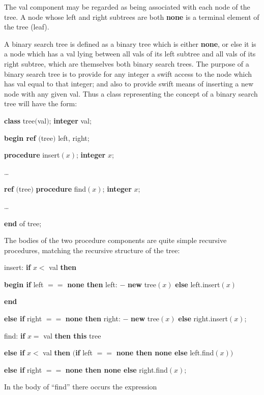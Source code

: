 \documentclass[twoside,11pt]{book}
\begin{document}
\noindent
The val component may be regarded as being associated with each node of the tree. A node whose left and right subtrees are both \textbf{none} is a terminal element of the tree (leaf).

A binary search tree is defined as a binary tree which is either \textbf{none}, or else it is a node which has a val lying between all vals of its left subtree and all vals of its right subtree, which are themselves both binary search trees. The purpose of a binary search tree is to provide for any integer a swift access to the node which has val equal to that integer; and also to provide swift means of inserting a new node with any given val. Thus a class representing the concept of a binary search tree will have the form:

\quad \textbf{class} tree$($val$)$; \textbf{integer} val;

\quad \quad \textbf{begin ref} $($tree$)$ left, right;

\quad \quad \quad \textbf{procedure} insert$(x)$; \textbf{integer} $x$;

\quad \quad \quad \quad \dots

\quad \quad \quad \textbf{ref} $($tree$)$ \textbf{procedure} find$(x)$; \textbf{integer} $x$;

\quad \quad \quad \quad \dots

\quad \quad \textbf{end} of tree;

The bodies of the two procedure components are quite simple recursive procedures, matching the recursive structure of the tree:

\quad insert: \textbf{if} $x <$ val \textbf{then}

\quad \quad \textbf{begin if} left $==$ \textbf{none then} left: $-$ \textbf{new} tree$(x)$ \textbf{else} left.insert$(x)$

\quad \quad \textbf{end}

\quad \textbf{else if} right $==$ \textbf{none then} right: $-$ \textbf{new} tree$(x)$ \textbf{else} right.insert$(x)$;
\smallskip

\quad find: \textbf{if} $x =$ val \textbf{then this} tree

\quad \textbf{else if} $x <$ val \textbf{then} $($\textbf{if} left $==$ \textbf{none then none else} left.find$(x))$

\quad \textbf{else if} right $==$ \textbf{none then none else} right.find$(x);$

\noindent
In the body of ``find'' there occurs the expression
\end{document}

